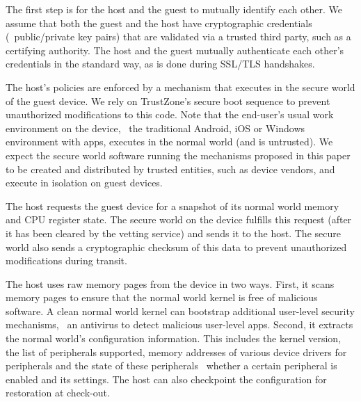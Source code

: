 \begin{mylist}
%
\item {} The first step is for the host and the guest to
mutually identify each other. We assume that both the guest and the host have
cryptographic credentials (\eg~public/private key pairs) that are validated
via a trusted third party, such as a certifying authority. The host and the
guest mutually authenticate each other's credentials in the standard way, as is
done during SSL/TLS handshakes.

The host's policies are enforced by a mechanism that executes in the secure
world of the guest device. We rely on TrustZone's secure boot sequence to
prevent unauthorized modifications to this code. Note that the end-user's usual
work environment on the device, \eg~the traditional Android, iOS or Windows
environment with apps, executes in the normal world (and is untrusted). We
expect the secure world software running the mechanisms proposed in this paper
to be created and distributed by trusted entities, such as device vendors, and
execute in isolation on guest devices.

\item {} The host requests the guest
device for a snapshot of its normal world memory and CPU register state. The
secure world on the device fulfills this request (after it has been cleared by
the vetting service) and sends it to the host. The secure world also sends a
cryptographic checksum of this data to prevent unauthorized modifications
during transit.

The host uses raw memory pages from the device in two ways. First, it scans
memory pages to ensure that the normal world kernel is free of malicious
software. A clean normal world kernel can bootstrap additional user-level
security mechanisms, \eg~an antivirus to detect malicious user-level apps.
Second, it extracts the normal world's configuration information. This includes
the kernel version, the list of peripherals supported, memory addresses of
various device drivers for peripherals and the state of these peripherals
\eg~whether a certain peripheral is enabled and its settings. The host can also
checkpoint the configuration for restoration at check-out. 



\end{mylist}
